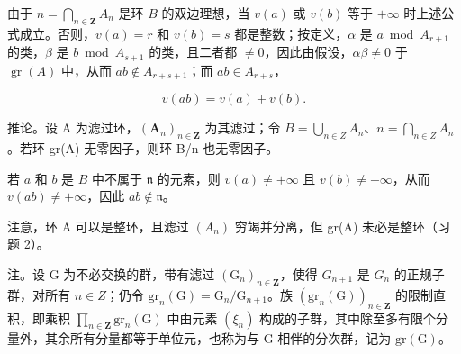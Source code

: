 	由于 \(n = \bigcap_{n \in \mathbf{Z}} A_n\) 是环 \(B\) 的双边理想，当 \(v(a)\) 或 \(v(b)\) 等于 \(+\infty\) 时上述公式成立。否则，\(v(a) = r\) 和 \(v(b) = s\) 都是整数；按定义，\(\alpha\) 是 \(a \bmod A_{r+1}\) 的类，\(\beta\) 是 \(b \bmod A_{s+1}\) 的类，且二者都 \(\neq 0\)，因此由假设，\(\alpha \beta \neq 0\) 于 \(\operatorname{gr}(A)\) 中，从而 \(ab \notin A_{r+s+1}\)；而 \(ab \in A_{r+s}\)，

\[
v (a b) = v (a) + v (b).
\]

推论。设 A 为滤过环，\((\mathbf{A}_{n})_{n\in\mathbf{Z}}\) 为其滤过；令 \(B=\bigcup_{n\in Z}A_{n}\)、\(n=\bigcap_{n\in Z}A_{n}\)。若环 gr(A) 无零因子，则环 B/n 也无零因子。

	若 \(a\) 和 \(b\) 是 \(B\) 中不属于 \(\mathfrak{n}\) 的元素，则 \(v(a) \neq +\infty\) 且 \(v(b) \neq +\infty\)，从而 \(v(ab) \neq +\infty\)，因此 \(ab \notin \mathfrak{n}\)。

注意，环 A 可以是整环，且滤过 \((A_{n})\) 穷竭并分离，但 gr(A) 未必是整环（习题 2）。

	注。设 G 为不必交换的群，带有滤过 \((\mathrm{G}_{n})_{n\in\mathbf{Z}}\)，使得 \(G_{n+1}\) 是 \(G_{n}\) 的正规子群，对所有 \(n\in Z\)；仍令 \(\mathrm{gr}_{n}(\mathrm{G})=\mathrm{G}_{n}/\mathrm{G}_{n+1}\)。族 \((\mathrm{gr}_{n}(\mathrm{G}))_{n\in\mathbf{Z}}\) 的限制直积，即乘积 \(\prod_{n\in\mathbf{Z}}\mathrm{gr}_{n}(\mathrm{G})\) 中由元素 \((\xi_{n})\) 构成的子群，其中除至多有限个分量外，其余所有分量都等于单位元，也称为与 G 相伴的分次群，记为 \(\mathrm{gr}(\mathrm{G})\)。


